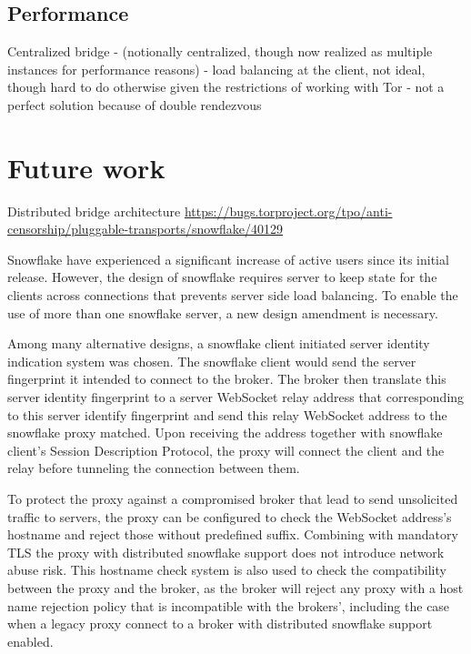 \documentclass[letterpaper,twocolumn]{article}
\begin{document}
\subsection{Performance}
\label{sec:performance}


Centralized bridge
- (notionally centralized, though now realized as multiple instances for performance reasons)
- load balancing at the client, not ideal, though hard to do otherwise given the restrictions of working with Tor
- not a perfect solution because of double rendezvous

\section{Future work}
\label{sec:future}


Distributed bridge architecture
\url{https://bugs.torproject.org/tpo/anti-censorship/pluggable-transports/snowflake/40129}

Snowflake have experienced a significant increase of active users since its initial release. However, the design of snowflake requires server to keep state for the clients across connections that prevents server side load balancing. To enable the use of more than one snowflake server, a new design amendment is necessary.

Among many alternative designs, a snowflake client initiated server identity indication system was chosen. The snowflake client would send the server fingerprint it intended to connect to the broker. The broker then translate this server identity fingerprint to a server WebSocket relay address that corresponding to this server identify fingerprint and send this relay WebSocket address to the snowflake proxy matched. Upon receiving the address together with snowflake client's Session Description Protocol, the proxy will connect the client and the relay before tunneling the connection between them.

To protect the proxy against a compromised broker that lead to send unsolicited traffic to servers, the proxy can be configured to check the WebSocket address's hostname and reject those without predefined suffix. Combining with mandatory TLS the proxy with distributed snowflake support does not introduce network abuse risk. This hostname check system is also used to check the compatibility between the proxy and the broker, as the broker will reject any proxy with a host name rejection policy that is incompatible with the brokers', including the case when a legacy proxy connect to a broker with distributed snowflake support enabled.
\end{document}
